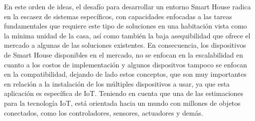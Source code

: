 En este orden de ideas, el desafío para desarrollar un entorno Smart House radica en la escasez de sistemas específicos, con capacidades enfocadas a las tareas fundamentales que requiere este tipo de soluciones en una habitación vista como la mínima unidad de la casa, así como también la baja asequibilidad que ofrece el mercado a algunas de las soluciones existentes. En consecuencia, los dispositivos de Smart House disponibles en el mercado, no se enfocan en la escalabilidad en cuanto a los costos de implementación y algunos dispositvos tampoco se enfocan en la compatibilidad, dejando de lado estos conceptos, que son muy importantes en relación a la instalación de los múltiples dispositivos a usar, ya que esta aplicación es específica de IoT. Teniendo en cuenta que una de las estimaciones para la tecnología IoT, está orientada hacia un mundo con millones de objetos conectados, como los controladores, sensores, actuadores y demás.\\
